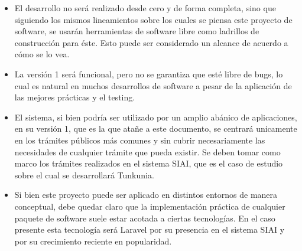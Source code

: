 \begin{itemize}
    \item El desarrollo no será realizado desde cero y de forma completa, sino que siguiendo los mismos lineamientos sobre los cuales se piensa este proyecto de software, se usarán herramientas de software libre como ladrillos de construcción para éste. Esto puede ser considerado un alcance de acuerdo a cómo se lo vea.
    \item La versión 1 será funcional, pero no se garantiza que esté libre de bugs, lo cual es natural en muchos desarrollos de software a pesar de la aplicación de las mejores prácticas y el testing.
    \item El sistema, si bien podría ser utilizado por un amplio abánico de aplicaciones, en su versión 1, que es la que atañe a este documento, se centrará unicamente en los trámites públicos más comunes y sin cubrir necesariamente las necesidades de cualquier trámite que pueda existir. Se deben tomar como marco los trámites realizados en el sistema SIAI, que es el caso de estudio sobre el cual se desarrollará Tunkunia.
    \item Si bien este proyecto puede ser aplicado en distintos entornos de manera conceptual, debe quedar claro que la implementación práctica de cualquier paquete de software suele estar acotada a ciertas tecnologías. En el caso presente esta tecnología será Laravel por su presencia en el sistema SIAI y por su crecimiento reciente en popularidad.
\end{itemize}